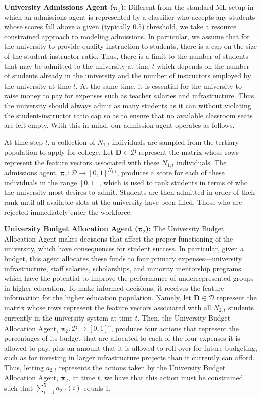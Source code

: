 \textbf{University Admissions Agent ($\boldsymbol{\pi}_1$):}
Different from the standard ML setup in which an admissions agent is represented by a classifier who accepts any students whose scores fall above a given (typically 0.5) threshold, we take a resource constrained approach to modeling admissions. In particular, we assume that for the university to provide quality instruction to students, there is a cap on the size of the student-instructor ratio. Thus, there is a limit to the number of students that may be admitted to the university at time $t$ which depends on the number of students already in the university and the number of instructors employed by the university at time $t$. At the same time, it is essential for the university to raise money to pay for expenses such as teacher salaries and infrastructure. Thus, the university should always admit as many students as it can without violating the student-instructor ratio cap so as to ensure that no available classroom seats are left empty. With this in mind, our admission agent operates as follows.

At time step $t$, a collection of $N_{1,t}$ individuals are sampled from the tertiary population to apply for college. Let $\mathbf{D}\in\mathcal{D}$ represent the matrix whose rows represent the feature vectors associated with these $N_{1,t}$ individuals. The admissions agent, $\boldsymbol{\pi}_1:\mathcal{D}\rightarrow[0,1]^{N_{1,t}}$, 
produces a score for each of these individuals in the range $[0,1]$, which is used to rank students in terms of who the university most desires to admit. Students are then admitted in order of their rank until all available slots at the university have been filled. Those who are rejected immediately enter the workforce.

\textbf{University Budget Allocation Agent ($\boldsymbol{\pi}_2$):}
The University Budget Allocation Agent makes decisions that affect the proper functioning of the university, which have consequences for student success. In particular, given a budget, this agent allocates these funds to four primary expenses---university infrastructure, staff salaries, scholarships, and minority mentorship programs which have the potential to improve the performance of underrepresented groups in higher education. To make informed decisions, it receives the feature information for the higher education population. Namely, let $\mathbf{D}\in\mathcal{D}$ represent the matrix whose rows represent the feature vectors associated with all $N_{2,t}$ students currently in the university system at time $t$. Then, the University Budget Allocation Agent, $\boldsymbol{\pi}_2:\mathcal{D}\rightarrow[0,1]^{5}$, produces four actions that represent the percentages of its budget that are allocated to each of the four expenses it is allowed to pay, plus an amount that it is allowed to roll over for future budgeting, such as for investing in larger infrastructure projects than it currently can afford. Thus, letting $a_{2,t}$ represents the actions taken by the University Budget Allocation Agent, $\boldsymbol{\pi}_2$, at time $t$, we have that this action must be constrained such that  $\sum_{i=1}^{5}a_{2,t}(i)$ equals 1.

